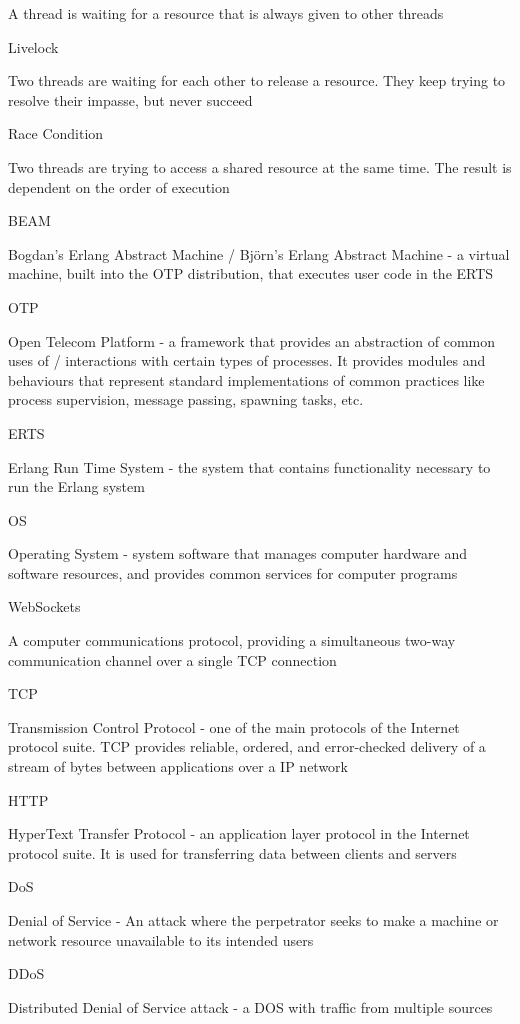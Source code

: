 \documentclass[]{final}
\begin{document}
A thread is waiting for a resource that is always given to other threads

Livelock

Two threads are waiting for each other to release a resource. They keep trying to resolve their impasse, but never succeed

Race Condition

Two threads are trying to access a shared resource at the same time. The result is dependent on the order of execution

BEAM

Bogdan's Erlang Abstract Machine / Björn's Erlang Abstract Machine - a virtual machine, built into the OTP
distribution, that executes user code in the ERTS

OTP

Open Telecom Platform - a framework that provides an abstraction of common uses of / interactions with
certain types of processes. It provides modules and behaviours that represent standard implementations of
common practices like process supervision, message passing, spawning tasks, etc.

ERTS

Erlang Run Time System - the system that contains functionality necessary to run the Erlang system

OS

Operating System - system software that manages computer hardware and software resources, and
provides common services for computer programs

WebSockets

A computer communications protocol, providing a simultaneous two-way communication channel
over a single TCP connection

TCP

Transmission Control Protocol - one of the main protocols of the Internet protocol suite. TCP provides
reliable, ordered, and error-checked delivery of a stream of bytes between applications over a IP network

HTTP

HyperText Transfer Protocol - an application layer protocol in the Internet protocol suite.
It is used for transferring data between clients and servers

DoS

Denial of Service - An attack where the perpetrator seeks to make a machine or network resource unavailable
to its intended users

DDoS

Distributed Denial of Service attack - a DOS with traffic from multiple sources
\end{document}
